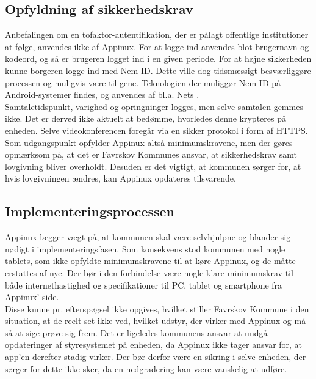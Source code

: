 \subsection{Opfyldning af sikkerhedskrav}
Anbefalingen om en tofaktor-autentifikation, der er pålagt offentlige institutioner at følge, anvendes ikke af Appinux. For at logge ind anvendes blot brugernavn og kodeord, og så er brugeren logget ind i en given periode. For at højne sikkerheden kunne borgeren logge ind med Nem-ID. Dette ville dog tidsmæssigt besværliggøre processen og muligvis være til gene. Teknologien der muliggør Nem-ID på Android-systemer findes, og anvendes af bl.a. Nets \parencite{netsapp}.\\
Samtaletidspunkt, varighed og opringninger logges, men selve samtalen gemmes ikke. Det er derved ikke aktuelt at bedømme, hvorledes denne krypteres på enheden. Selve videokonferencen foregår via en sikker protokol i form af HTTPS.\\Som udgangspunkt opfylder Appinux altså minimumskravene, men der gøres opmærksom på, at det er Favrskov Kommunes ansvar, at sikkerhedskrav samt lovgivning bliver overholdt. Desuden er det vigtigt, at kommunen sørger for, at hvis lovgivningen ændres, kan Appinux opdateres tilsvarende.

\subsection{Implementeringsprocessen}
Appinux lægger vægt på, at kommunen skal være selvhjulpne og blander sig nødigt i implementeringsfasen. Som konsekvens stod kommunen med nogle tablets, som ikke opfyldte minimumskravene til at køre Appinux, og de måtte erstattes af nye. Der bør i den forbindelse være nogle klare minimumskrav til både internethastighed og specifikationer til PC, tablet og smartphone fra Appinux' side.\\Disse kunne pr. efterspøgsel ikke opgives, hvilket stiller Favrskov Kommune i den situation, at de reelt set ikke ved, hvilket udstyr, der virker med Appinux og må så at sige prøve sig frem. Det er ligeledes kommunens ansvar at undgå opdateringer af styresystemet på enheden, da Appinux ikke tager ansvar for, at app'en derefter stadig virker. Der bør derfor være en sikring i selve enheden, der sørger for dette ikke sker, da en nedgradering kan være vanskelig at udføre.
